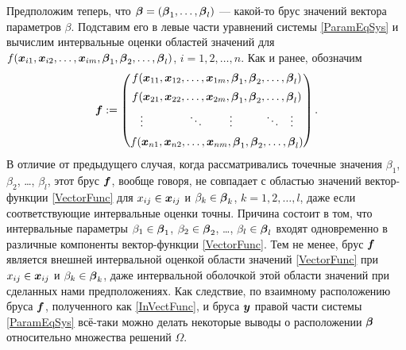 \documentclass[a5paper,openany]{book}
\newcommand{\mbf}[1]{\protect\text{\boldmath$#1$}}
\begin{document}
Предположим теперь, что $\mbf{\beta} = (\mbf{\beta}_{1}, \ldots, \mbf{\beta}_{l})$ 
--- какой-то брус значений вектора параметров $\beta$. Подставим его в левые части 
уравнений системы \eqref{ParamEqSys} и вычислим интервальные оценки областей значений 
для $f(\mbf{x}_{i1}, \mbf{x}_{i2}, \ldots, \mbf{x}_{im}, \mbf{\beta}_{1}, \mbf{\beta}_{2}, 
\ldots, \mbf{\beta}_{l})$, $i = 1,2,\ldots,n$. Как и ранее, обозначим 
\begin{equation} 
\label{InVectFunc} 
\mbf{f} := 
\begin{pmatrix} 
f(\mbf{x}_{11}, \mbf{x}_{12}, \ldots, \mbf{x}_{1m}, 
                \mbf{\beta}_{1}, \mbf{\beta}_{2}, \ldots, \mbf{\beta}_{l}) \\[5pt] 
f(\mbf{x}_{21}, \mbf{x}_{22}, \ldots, \mbf{x}_{2m}, 
                \mbf{\beta}_{1}, \mbf{\beta}_{2}, \ldots, \mbf{\beta}_{l}) \\[5pt] 
\vdots\hspace{14mm}\ddots \hspace{8mm}  \vdots 
                                 \hspace{10mm}  \ddots \hspace{3mm} \vdots \\[5pt]
f(\mbf{x}_{n1}, \mbf{x}_{n2}, \ldots, \mbf{x}_{nm}, 
                \mbf{\beta}_{1}, \mbf{\beta}_{2}, \ldots, \mbf{\beta}_{l}) 
\end{pmatrix}. 
\end{equation} 
В отличие от предыдущего случая, когда рассматривались точечные значения $\beta_1$, 
$\beta_2$, \ldots, $\beta_l$, этот брус $\mbf{f}$, вообще говоря, не совпадает 
с областью значений вектор-функции \eqref{VectorFunc} для $x_{ij}\in\mbf{x}_{ij}$ 
и $\beta_{k}\in\mbf{\beta}_k$, $k = 1,2,\ldots,l$, даже если соответствующие 
интервальные оценки точны. Причина состоит в том, что  интервальные параметры 
$\beta_{1}\in\mbf{\beta}_1$, $\beta_{2} \in\mbf{\beta}_2$, \ldots, $\beta_{l}\in 
\mbf{\beta}_l$ входят одновременно в различные компоненты вектор-функции 
\eqref{VectorFunc}. Тем не менее, брус $\mbf{f}$ является внешней интервальной 
оценкой области значений \eqref{VectorFunc} при $x_{ij}\in\mbf{x}_{ij}$ и $\beta_{k} 
\in\mbf{\beta}_k$, даже интервальной оболочкой этой области значений при сделанных 
нами предположениях. Как следствие, по взаимному расположению бруса $\mbf{f}$, 
полученного как \eqref{InVectFunc}, и бруса $\mbf{y}$ правой части системы 
\eqref{ParamEqSys} всё-таки можно делать некоторые выводы о расположении 
$\mbf{\beta}$ относительно множества решений $\varOmega$. 
  
\end{document}
